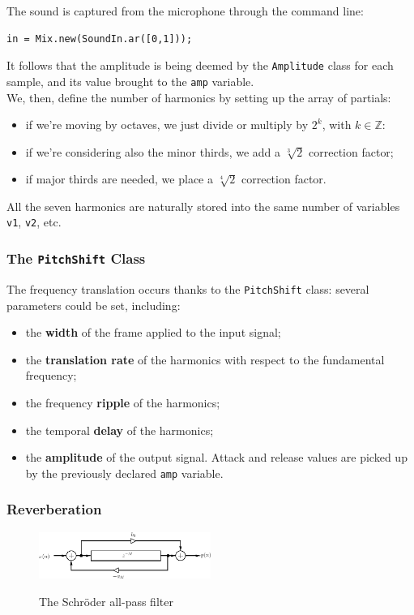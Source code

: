 \documentclass[11pt]{article}
\begin{document}
The sound is captured from the microphone through the command line:

\begin{verbatim}
in = Mix.new(SoundIn.ar([0,1]));
\end{verbatim}

It follows that the amplitude is being deemed by the \texttt{Amplitude} class for each sample, and its value brought to the \texttt{amp} variable.\\

We, then, define the number of harmonics by setting up the array of partials:
\begin{itemize}
\item if we're moving by octaves, we just divide or multiply by $2^k$, with $k\in\mathbb{Z}$:
\item if we're considering also the minor thirds, we add a $\sqrt[3]{2}$ correction factor;
\item if major thirds are needed, we place a $\sqrt[4]{2}$ correction factor.
\end{itemize}
All the seven harmonics are naturally stored into the same number of variables \texttt{v1}, \texttt{v2}, etc.

\subsubsection{The \texttt{PitchShift} Class}
The frequency translation occurs thanks to the \texttt{PitchShift} class: several parameters could be set, including:
\begin{itemize}
\item the \textbf{width} of the frame applied to the input signal;
\item the \textbf{translation rate} of the harmonics with respect to the fundamental frequency;
\item the frequency \textbf{ripple} of the harmonics;
\item the temporal \textbf{delay} of the harmonics;
\item the \textbf{amplitude} of the output signal. Attack and release values are picked up by the previously declared \texttt{amp} variable.
\end{itemize}

\subsubsection{Reverberation}

\begin{figure}
\centering
\includegraphics[width=0.5\textwidth]{Allpass.png}
\label{fig:AllpassFilter}
\caption{The Schröder all-pass filter}
\end{figure}
\end{document}
